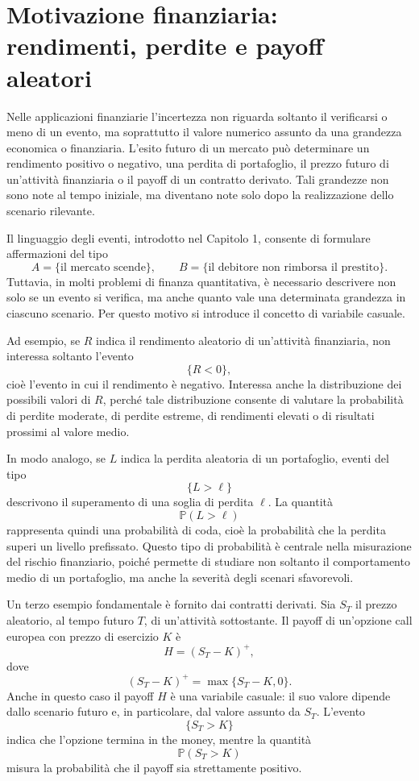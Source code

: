 \section{Motivazione finanziaria: rendimenti, perdite e payoff aleatori}

\label{sec:cap2-motivazione-finanziaria}

Nelle applicazioni finanziarie l'incertezza non riguarda soltanto il
verificarsi o meno di un evento, ma soprattutto il valore numerico assunto da
una grandezza economica o finanziaria. L'esito futuro di un mercato pu\`{o}
determinare un rendimento positivo o negativo, una perdita di portafoglio, il
prezzo futuro di un'attivit\`{a} finanziaria o il payoff di un contratto
derivato. Tali grandezze non sono note al tempo iniziale, ma diventano note
solo dopo la realizzazione dello scenario rilevante.

Il linguaggio degli eventi, introdotto nel Capitolo 1, consente di formulare
affermazioni del tipo
\[
A=\{\text{il mercato scende}\}, \qquad B=\{\text{il debitore non rimborsa il
prestito}\}.
\]
Tuttavia, in molti problemi di finanza quantitativa, \`{e} necessario
descrivere non solo se un evento si verifica, ma anche quanto vale una
determinata grandezza in ciascuno scenario. Per questo motivo si introduce il
concetto di variabile casuale.

Ad esempio, se $R$ indica il rendimento aleatorio di un'attivit\`{a}
finanziaria, non interessa soltanto l'evento
\[
\{R<0\},
\]
cio\`{e} l'evento in cui il rendimento \`{e} negativo. Interessa anche la
distribuzione dei possibili valori di $R$, perch\'{e} tale distribuzione
consente di valutare la probabilit\`{a} di perdite moderate, di perdite
estreme, di rendimenti elevati o di risultati prossimi al valore medio.

In modo analogo, se $L$ indica la perdita aleatoria di un portafoglio, eventi
del tipo
\[
\{L>\ell\}
\]
descrivono il superamento di una soglia di perdita $\ell$. La quantit\`{a}
\[
\mathbb{P}(L>\ell)
\]
rappresenta quindi una probabilit\`{a} di coda, cio\`{e} la probabilit\`{a}
che la perdita superi un livello prefissato. Questo tipo di probabilit\`{a}
\`{e} centrale nella misurazione del rischio finanziario, poich\'{e} permette
di studiare non soltanto il comportamento medio di un portafoglio, ma anche la
severit\`{a} degli scenari sfavorevoli.

Un terzo esempio fondamentale \`{e} fornito dai contratti derivati. Sia
$S_{T}$ il prezzo aleatorio, al tempo futuro $T$, di un'attivit\`{a}
sottostante. Il payoff di un'opzione call europea con prezzo di esercizio $K$
\`{e}
\[
H=(S_{T}-K)^{+},
\]
dove
\[
(S_{T}-K)^{+}=\max\{S_{T}-K,0\}.
\]
Anche in questo caso il payoff $H$ \`{e} una variabile casuale: il suo valore
dipende dallo scenario futuro e, in particolare, dal valore assunto da $S_{T}%
$. L'evento
\[
\{S_{T}>K\}
\]
indica che l'opzione termina in the money, mentre la quantit\`{a}
\[
\mathbb{P}(S_{T}>K)
\]
misura la probabilit\`{a} che il payoff sia strettamente positivo.

